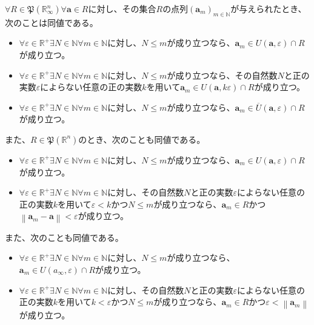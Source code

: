 \documentclass[dvipdfmx]{jsarticle}
\begin{document}
\begin{thm}\label{4.1.4.1}
$\forall R \in \mathfrak{P}\left( \mathbb{R}_{\infty}^{n} \right)\forall\mathbf{a} \in R$に対し、その集合$R$の点列$\left( \mathbf{a}_{m} \right)_{m \in \mathbb{N}}$が与えられたとき、次のことは同値である。
\begin{itemize}
\item
  $\forall\varepsilon \in \mathbb{R}^{+}\exists N \in \mathbb{N}\forall m \in \mathbb{N}$に対し、$N \leq m$が成り立つなら、$\mathbf{a}_{m} \in U\left( \mathbf{a},\varepsilon \right) \cap R$が成り立つ。
\item
  $\forall\varepsilon \in \mathbb{R}^{+}\exists N \in \mathbb{N}\forall m \in \mathbb{N}$に対し、$N \leq m$が成り立つなら、その自然数$N$と正の実数$\varepsilon$によらない任意の正の実数$k$を用いて$\mathbf{a}_{m} \in U\left( \mathbf{a},k\varepsilon \right) \cap R$が成り立つ。
\item
  $\forall\varepsilon \in \mathbb{R}^{+}\exists N \in \mathbb{N}\forall m \in \mathbb{N}$に対し、$N \leq m$が成り立つなら、$\mathbf{a}_{m} \in \overline{U}\left( \mathbf{a},\varepsilon \right) \cap R$が成り立つ。
\end{itemize}\par
また、$R \in \mathfrak{P}\left( \mathbb{R}^{n} \right)$のとき、次のことも同値である。
\begin{itemize}
\item
  $\forall\varepsilon \in \mathbb{R}^{+}\exists N \in \mathbb{N}\forall m \in \mathbb{N}$に対し、$N \leq m$が成り立つなら、$\mathbf{a}_{m} \in U\left( \mathbf{a},\varepsilon \right) \cap R$が成り立つ。
\item
  $\forall\varepsilon \in \mathbb{R}^{+}\exists N \in \mathbb{N}\forall m \in \mathbb{N}$に対し、その自然数$N$と正の実数$\varepsilon$によらない任意の正の実数$k$を用いて$\varepsilon < k$かつ$N \leq m$が成り立つなら、$\mathbf{a}_{m} \in R$かつ$\left\| \mathbf{a}_{m} - \mathbf{a} \right\| < \varepsilon$が成り立つ。
\end{itemize}\par
また、次のことも同値である。
\begin{itemize}
\item
  $\forall\varepsilon \in \mathbb{R}^{+}\exists N \in \mathbb{N}\forall m \in \mathbb{N}$に対し、$N \leq m$が成り立つなら、$\mathbf{a}_{m} \in U\left( a_{\infty},\varepsilon \right) \cap R$が成り立つ。
\item
  $\forall\varepsilon \in \mathbb{R}^{+}\exists N \in \mathbb{N}\forall m \in \mathbb{N}$に対し、その自然数$N$と正の実数$\varepsilon$によらない任意の正の実数$k$を用いて$k < \varepsilon$かつ$N \leq m$が成り立つなら、$\mathbf{a}_{m} \in R$かつ$\varepsilon < \left\| \mathbf{a}_{m} \right\|$が成り立つ。

\end{itemize}
\end{thm}
\end{document}
